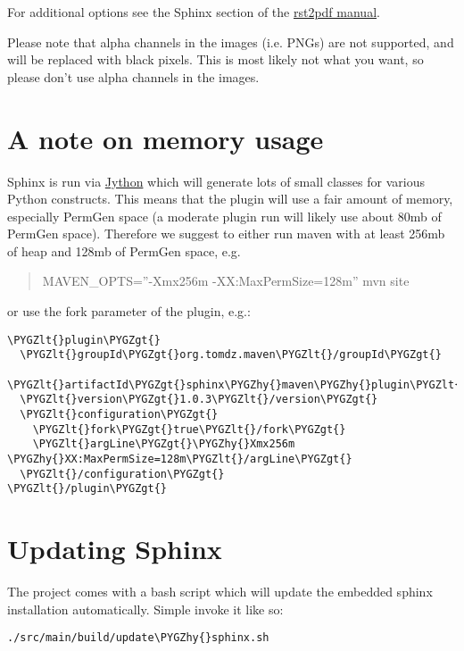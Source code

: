 \documentclass[letterpaper,10pt,english]{sphinxmanual}
\def\PYGZlt{\char`\<}
\def\PYGZgt{\char`\>}
\def\PYGZhy{\char`\-}
\begin{document}
For additional options see the Sphinx section of the \href{http://lateral.netmanagers.com.ar/static/manual.pdf}{rst2pdf manual}.

Please note that alpha channels in the images (i.e. PNGs) are not supported, and will be replaced with
black pixels. This is most likely not what you want, so please don't use alpha channels in the images.


\chapter{A note on memory usage}
\label{configuration:a-note-on-memory-usage}
Sphinx is run via \href{http://www.jython.org/}{Jython} which will generate lots of small classes for various Python constructs. This means that
the plugin will use a fair amount of memory, especially PermGen space (a moderate plugin run will likely use about 80mb
of PermGen space). Therefore we suggest to either run maven with at least 256mb of heap and 128mb of PermGen space, e.g.
\begin{quote}

MAVEN\_OPTS=''-Xmx256m -XX:MaxPermSize=128m'' mvn site
\end{quote}

or use the fork parameter of the plugin, e.g.:

\begin{Verbatim}[commandchars=\\\{\}]
\PYGZlt{}plugin\PYGZgt{}
  \PYGZlt{}groupId\PYGZgt{}org.tomdz.maven\PYGZlt{}/groupId\PYGZgt{}
  \PYGZlt{}artifactId\PYGZgt{}sphinx\PYGZhy{}maven\PYGZhy{}plugin\PYGZlt{}/artifactId\PYGZgt{}
  \PYGZlt{}version\PYGZgt{}1.0.3\PYGZlt{}/version\PYGZgt{}
  \PYGZlt{}configuration\PYGZgt{}
    \PYGZlt{}fork\PYGZgt{}true\PYGZlt{}/fork\PYGZgt{}
    \PYGZlt{}argLine\PYGZgt{}\PYGZhy{}Xmx256m \PYGZhy{}XX:MaxPermSize=128m\PYGZlt{}/argLine\PYGZgt{}
  \PYGZlt{}/configuration\PYGZgt{}
\PYGZlt{}/plugin\PYGZgt{}
\end{Verbatim}


\chapter{Updating Sphinx}
\label{development:rst2pdf-bug}\label{development:updating-sphinx}\label{development::doc}
The project comes with a bash script which will update the embedded sphinx installation
automatically. Simple invoke it like so:

\begin{Verbatim}[commandchars=\\\{\}]
./src/main/build/update\PYGZhy{}sphinx.sh
\end{Verbatim}
\end{document}
